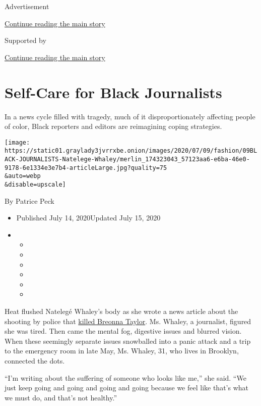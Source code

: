 Advertisement

\protect\hyperlink{after-top}{Continue reading the main story}

Supported by

\protect\hyperlink{after-sponsor}{Continue reading the main story}

\hypertarget{self-care-for-black-journalists}{%
\section{Self-Care for Black
Journalists}\label{self-care-for-black-journalists}}

In a news cycle filled with tragedy, much of it disproportionately
affecting people of color, Black reporters and editors are reimagining
coping strategies.

\texttt{[image: https://static01.graylady3jvrrxbe.onion/images/2020/07/09/fashion/09BLACK-JOURNALISTS-Natelege-Whaley/merlin\_174323043\_57123aa6-e6ba-46e0-9178-6e1334e3e7b4-articleLarge.jpg?quality=75\\\&auto=webp\\\&disable=upscale]}

By Patrice Peck

\begin{itemize}
\item
  Published July 14, 2020Updated July 15, 2020
\item
  \begin{itemize}
  \item
  \item
  \item
  \item
  \item
  \item
  \end{itemize}
\end{itemize}

Heat flushed Natelegé Whaley's body as she wrote a news article about
the shooting by police that
\href{https://www.nytimes3xbfgragh.onion/article/breonna-taylor-police.html}{killed
Breonna Taylor}. Ms. Whaley, a journalist, figured she was tired. Then
came the mental fog, digestive issues and blurred vision. When these
seemingly separate issues snowballed into a panic attack and a trip to
the emergency room in late May, Ms. Whaley, 31, who lives in Brooklyn,
connected the dots.

``I'm writing about the suffering of someone who looks like me,'' she
said. ``We just keep going and going and going and going because we feel
like that's what we must do, and that's not healthy.''

